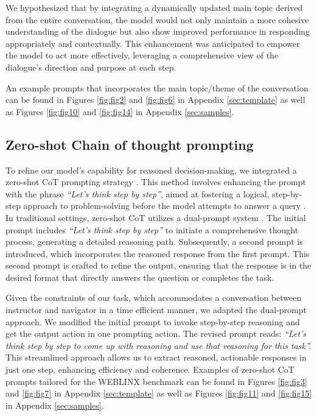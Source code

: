 \documentclass[11pt]{article}
\begin{document}
We hypothesized that by integrating a dynamically updated main topic derived from the entire conversation, the model would not only maintain a more cohesive understanding of the dialogue but also show improved performance in responding appropriately and contextually. This enhancement was anticipated to empower the model to act more effectively, leveraging a comprehensive view of the dialogue's direction and purpose at each step.

An example prompts that incorporates the main topic/theme of the conversation can be found in Figures \ref{fig:fig2} and \ref{fig:fig6} in Appendix \ref{sec:template} as well as Figures \ref{fig:fig10} and \ref{fig:fig14} in Appendix \ref{sec:samples}. 

\subsection{Zero-shot Chain of thought prompting}
To refine our model's capability for reasoned decision-making, we integrated a zero-shot CoT prompting strategy \cite{Large_Language_Models_Zero_Shot_Reasoners}. This method involves enhancing the prompt with the phrase \emph{“Let's think step by step”}, aimed at fostering a logical, step-by-step approach to problem-solving before the model attempts to answer a query \cite{Large_Language_Models_Zero_Shot_Reasoners}. In traditional settings, zero-shot CoT utilizes a dual-prompt system \cite{Large_Language_Models_Zero_Shot_Reasoners}. The initial prompt includes \emph{“Let's think step by step”} to initiate a comprehensive thought process, generating a detailed reasoning path. Subsequently, a second prompt is introduced, which incorporates the reasoned response from the first prompt. This second prompt is crafted to refine the output, ensuring that the response is in the desired format that directly answers the question or completes the task.

Given the constraints of our task, which accommodates a conversation between instructor and navigator in a time efficient manner, we adapted the dual-prompt approach. We modified the initial prompt to invoke step-by-step reasoning and get the output action in one prompting action. The revised prompt reads: \emph{“Let's think step by step to come up with reasoning and use that reasoning for this task”.} This streamlined approach allows us to extract reasoned, actionable responses in just one step, enhancing efficiency and coherence. Examples of zero-shot CoT prompts tailored for the WEBLINX benchmark can be found in Figures \ref{fig:fig3} and \ref{fig:fig7} in Appendix \ref{sec:template} as well as Figures \ref{fig:fig11} and \ref{fig:fig15} in Appendix \ref{sec:samples}. 
\end{document}
